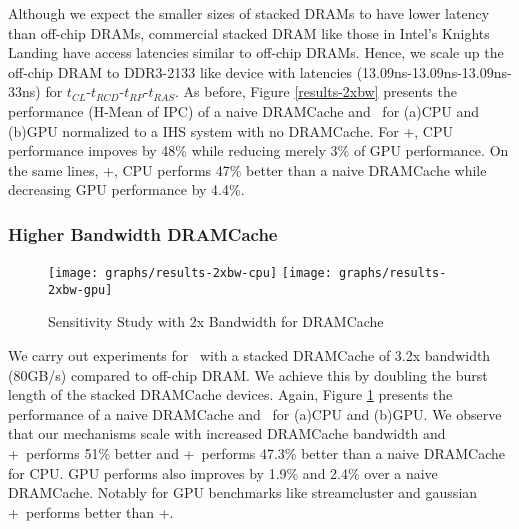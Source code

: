 Although we expect the smaller sizes of stacked DRAMs to have lower latency than off-chip DRAMs, commercial stacked DRAM like those in Intel's Knights Landing \cite{xeonphi} have access latencies similar to off-chip DRAMs. Hence, we scale up the off-chip DRAM to DDR3-2133 like device with latencies (13.09ns-13.09ns-13.09ns-33ns) for $t_{CL}$-$t_{RCD}$-$t_{RP}$-$t_{RAS}$. As before, Figure \ref{results-2xbw} presents the performance (H-Mean of IPC) of a naive DRAMCache and \cachename\ for (a)CPU and (b)GPU normalized to a IHS system with no DRAMCache. For \prioname+\bypassname, CPU performance impoves by 48\% while reducing merely 3\% of GPU performance. On the same lines, \prioname+\chaining, CPU performs 47\% better than a naive DRAMCache while decreasing GPU performance by 4.4\%.

\subsubsection{Higher Bandwidth DRAMCache}

\begin{figure}[!htb]
	\centering
	\texttt{[image: graphs/results-2xbw-cpu]}
	\texttt{[image: graphs/results-2xbw-gpu]}
	\caption{Sensitivity Study with 2x Bandwidth for DRAMCache}
	\label{results-ddr3-2133}
\end{figure}

We carry out experiments for \cachename\ with a stacked DRAMCache of 3.2x bandwidth (80GB/s) compared to off-chip DRAM. We achieve this by doubling the burst length of the stacked DRAMCache devices. Again, Figure \ref{results-ddr3-2133}  presents the performance of a naive DRAMCache and \cachename\ for (a)CPU and (b)GPU. We observe that our mechanisms scale with increased DRAMCache bandwidth and \bypassname+\prioname\ performs 51\% better and \chaining+\prioname\ performs 47.3\% better than a naive DRAMCache for CPU. GPU performs also improves by 1.9\% and 2.4\% over a naive DRAMCache. Notably for GPU benchmarks like streamcluster and gaussian \chaining+\prioname\ performs better than \bypassname+\prioname.
